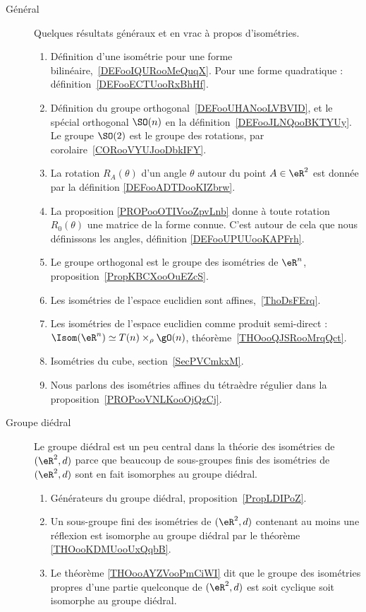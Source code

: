 \begin{description}
	\item[Général]
		Quelques résultats généraux et en vrac à propos d'isométries.
		\begin{enumerate}
			\item
			      Définition d'une isométrie pour une forme bilinéaire,~\ref{DEFooIQURooMeQuqX}. Pour une forme quadratique : définition~\ref{DEFooECTUooRxBhHf}.
			\item
			      Définition du groupe orthogonal~\ref{DEFooUHANooLVBVID}, et le spécial orthogonal \( \SO(n)\) en la définition~\ref{DEFooJLNQooBKTYUy}. Le groupe \( \SO(2)\) est le groupe des rotations, par corolaire~\ref{CORooVYUJooDbkIFY}.
			\item
			      La rotation \( R_A(\theta)\) d'un angle \( \theta\) autour du point \( A\in \eR^2\) est donnée par la définition \ref{DEFooADTDooKIZbrw}.
			\item
			      La proposition \ref{PROPooOTIVooZpvLnb} donne à toute rotation \( R_0(\theta)\) une matrice de la forme connue. C'est autour de cela que nous définissons les angles, définition \ref{DEFooUPUUooKAPFrh}.
			\item
			      Le groupe orthogonal est le groupe des isométries de \( \eR^n\), proposition~\ref{PropKBCXooOuEZcS}.
			\item
			      Les isométries de l'espace euclidien sont affines,~\ref{ThoDsFErq}.
			\item
			      Les isométries de l'espace euclidien comme produit semi-direct : \( \Isom(\eR^n)\simeq T(n)\times_{\rho}\gO(n)\), théorème~\ref{THOooQJSRooMrqQct}.
			\item
			      Isométries du cube, section~\ref{SecPVCmkxM}.
			\item
			      Nous parlons des isométries affines du tétraèdre régulier dans la proposition~\ref{PROPooVNLKooOjQzCj}.
		\end{enumerate}

	\item[Groupe diédral]
		Le groupe diédral est un peu central dans la théorie des isométries de \( (\eR^2,d)\) parce que beaucoup de sous-groupes finis des isométries de \( (\eR^2,d)\) sont en fait isomorphes au groupe diédral.
		\begin{enumerate}
			\item
			      Générateurs du groupe diédral, proposition~\ref{PropLDIPoZ}.
			\item
			      Un sous-groupe fini des isométries de \( (\eR^2,d)\) contenant au moins une réflexion est isomorphe au groupe diédral par le théorème \ref{THOooKDMUooUxQqbB}.
			\item
			      Le théorème \ref{THOooAYZVooPmCiWI} dit que le groupe des isométries propres d'une partie quelconque de \( (\eR^2,d)\) est soit cyclique soit isomorphe au groupe diédral.
		\end{enumerate}


\end{description}
